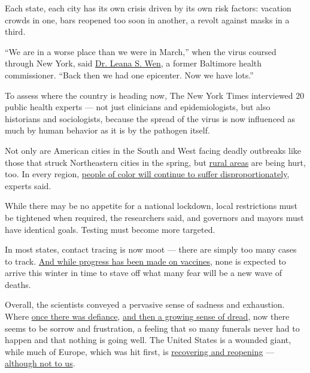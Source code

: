 Each state, each city has its own crisis driven by its own risk factors:
vacation crowds in one, bars reopened too soon in another, a revolt
against masks in a third.

``We are in a worse place than we were in March,'' when the virus
coursed through New York, said
\href{https://www.gwumc.edu/smhs/facultydirectory/profile.cfm?empName=Leana\%20Wen\&FacID=2073685428}{Dr.
Leana S. Wen}, a former Baltimore health commissioner. ``Back then we
had one epicenter. Now we have lots.''

To assess where the country is heading now, The New York Times
interviewed 20 public health experts --- not just clinicians and
epidemiologists, but also historians and sociologists, because the
spread of the virus is now influenced as much by human behavior as it is
by the pathogen itself.

Not only are American cities in the South and West facing deadly
outbreaks like those that struck Northeastern cities in the spring, but
\href{https://www.nytimes3xbfgragh.onion/2020/07/14/us/coronavirus-texas-rio-grande-valley-border.html}{rural
areas} are being hurt, too. In every region,
\href{https://www.nytimes3xbfgragh.onion/interactive/2020/07/05/us/coronavirus-latinos-african-americans-cdc-data.html}{people
of color will continue to suffer disproportionately}, experts said.

While there may be no appetite for a national lockdown, local
restrictions must be tightened when required, the researchers said, and
governors and mayors must have identical goals. Testing must become more
targeted.

In most states, contact tracing is now moot --- there are simply too
many cases to track.
\href{https://www.nytimes3xbfgragh.onion/interactive/2020/science/coronavirus-vaccine-tracker.html}{And
while progress has been made on vaccines}, none is expected to arrive
this winter in time to stave off what many fear will be a new wave of
deaths.

Overall, the scientists conveyed a pervasive sense of sadness and
exhaustion. Where
\href{https://www.nytimes3xbfgragh.onion/2020/03/22/health/coronavirus-restrictions-us.html}{once
there was defiance},
\href{https://www.nytimes3xbfgragh.onion/2020/04/18/health/coronavirus-america-future.html}{and
then a growing sense of dread}, now there seems to be sorrow and
frustration, a feeling that so many funerals never had to happen and
that nothing is going well. The United States is a wounded giant, while
much of Europe, which was hit first, is
\href{https://www.nytimes3xbfgragh.onion/2020/07/14/business/europe-consumer-spending.html}{recovering
and reopening} ---
\href{https://www.nytimes3xbfgragh.onion/article/eu-travel-ban-explained-usa.html}{although
not to us}.

